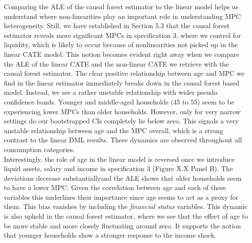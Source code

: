 Comparing the ALE of the causal forest estimator to the linear model helps us understand where non-linearities play an important role in understanding MPC heterogeneity. Still, we have established in Section 5.3 that the causal forest estimator reveals more significant MPCs in specification 3, where we control for liquidity, which is likely to occur because of nonlinearities not picked up in the linear CATE model. This notion becomes evident right away when we compare the ALE of the linear CATE and the non-linear CATE we retrieve with the causal forest estimator. The clear positive relationship between age and MPC we find in the linear estimator immediately breaks down in the causal forest based model. Instead, we see a rather unstable relationship with wider pseudo confidence bands. Younger and middle-aged households (45 to 55) seem to be experiencing lower MPCs than older households. However, only for very narrow settings do our bootstrapped CIs completely lie below zero. This signals a very unstable relationship between age and the MPC overall, which is a strong contrast to the linear DML results. These dynamics are observed throughout all consumption categories. \\
Interestingly, the role of age in the linear model is reversed once we introduce liquid assets, salary and income in specification 3 (Figure X.X Panel B). The deviations decrease substantiallyand the ALE shows that older households seem to have a lower MPC. Given the correlation between age and each of these variables this underlines their importance since age seems to act as a proxy for them. This bias vanishes by including the \textit{financial status} variables. This dynamic is also upheld in the causal forest estimator, where we see that the effect of age to be more stable and more closely fluctuating around zero. It supports the notion that younger households show a stronger response to the income shock. \\
